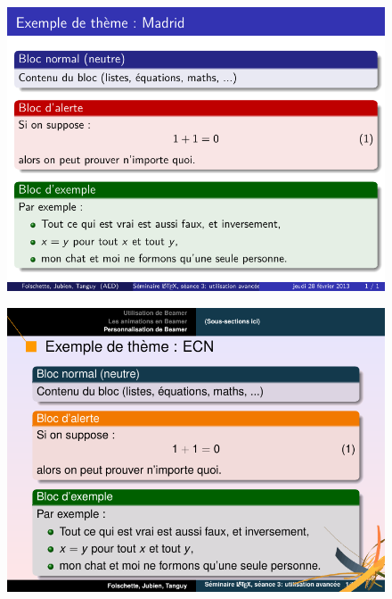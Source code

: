 \begin{frame}[plain]
\begin{figure}
  \centering
  \includegraphics[width=1\textwidth]{ppt_seance3_exblock}
\end{figure}
\end{frame}



\begin{frame}[plain]
\begin{figure}
  \centering
  \includegraphics[width=1\textwidth]{ppt_seance3_extheme_ecn}
\end{figure}
\end{frame}



